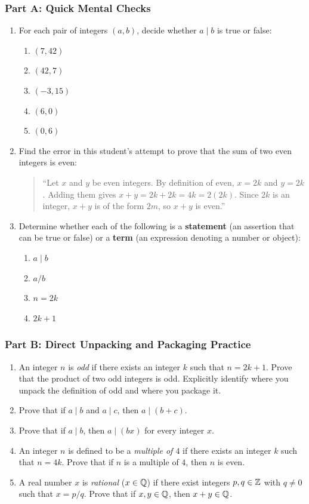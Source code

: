\subsubsection*{Part A: Quick Mental Checks}
\begin{enumerate}
\item For each pair of integers $(a, b)$, decide whether $a \mid b$ is true or false:
\begin{enumerate}[label=(\alph*)]
\item $(7, 42)$
\item $(42, 7)$
\item $(-3, 15)$
\item $(6, 0)$
\item $(0, 6)$
\end{enumerate}

\item Find the error in this student's attempt to prove that the sum of two even integers is even:
\begin{quote}
``Let $x$ and $y$ be even integers. By definition of even, $x = 2k$ and $y = 2k$. Adding them gives $x + y = 2k + 2k = 4k = 2(2k)$. Since $2k$ is an integer, $x + y$ is of the form $2m$, so $x + y$ is even.''
\end{quote}

\item Determine whether each of the following is a \textbf{statement} (an assertion that can be true or false) or a \textbf{term} (an expression denoting a number or object):
\begin{enumerate}[label=(\alph*)]
\item $a \mid b$
\item $a / b$
\item $n = 2k$
\item $2k + 1$
\end{enumerate}
\end{enumerate}

\subsubsection*{Part B: Direct Unpacking and Packaging Practice}
\begin{enumerate}[resume]
\item An integer $n$ is \emph{odd} if there exists an integer $k$ such that $n = 2k + 1$. Prove that the product of two odd integers is odd. Explicitly identify where you unpack the definition of odd and where you package it.
\item Prove that if $a \mid b$ and $a \mid c$, then $a \mid (b + c)$.
\item Prove that if $a \mid b$, then $a \mid (bx)$ for every integer $x$.
\item An integer $n$ is defined to be a \emph{multiple of $4$} if there exists an integer $k$ such that $n = 4k$. Prove that if $n$ is a multiple of $4$, then $n$ is even.
\item A real number $x$ is \emph{rational} ($x \in \mathbb{Q}$) if there exist integers $p, q \in \mathbb{Z}$ with $q \neq 0$ such that $x = p/q$. Prove that if $x, y \in \mathbb{Q}$, then $x + y \in \mathbb{Q}$.
\end{enumerate}


